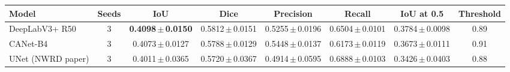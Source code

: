 \begin{tabular}{lccccccc}
\toprule
Model & Seeds & IoU & Dice & Precision & Recall & IoU at 0.5 & Threshold \\
\midrule
DeepLabV3+ R50 & 3 & \textbf{0.4098\,$\pm$\,0.0150} & 0.5812\,$\pm$\,0.0151 & 0.5255\,$\pm$\,0.0196 & 0.6504\,$\pm$\,0.0101 & 0.3784\,$\pm$\,0.0098 & 0.89 \\
CANet-B4 & 3 & 0.4073\,$\pm$\,0.0127 & 0.5788\,$\pm$\,0.0129 & 0.5448\,$\pm$\,0.0137 & 0.6173\,$\pm$\,0.0119 & 0.3673\,$\pm$\,0.0111 & 0.91 \\
UNet (NWRD paper) & 3 & 0.4011\,$\pm$\,0.0365 & 0.5720\,$\pm$\,0.0367 & 0.4914\,$\pm$\,0.0595 & 0.6888\,$\pm$\,0.0103 & 0.3426\,$\pm$\,0.0403 & 0.88 \\
\bottomrule
\end{tabular}

